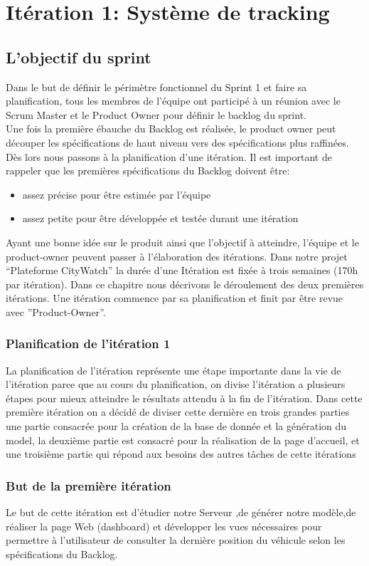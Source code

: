 \section{Itération 1: Système de tracking}

\subsection{L'objectif du sprint}
Dans le but de définir le périmètre fonctionnel du Sprint 1 et faire
sa planification, tous les membres de l'équipe ont participé à un réunion
avec le Scrum Master et le Product Owner pour définir le backlog du sprint.\\

Une fois la première ébauche du Backlog est réalisée, le product owner peut découper
les spécifications de haut niveau vers des spécifications plus raffinées. Dès lors nous
passons à la planification d’une itération. Il est important de rappeler que les premières
spécifications du Backlog doivent être:
\begin{itemize}
 \item assez précise pour être estimée par l’équipe
 \item assez petite pour être développée et testée durant une itération
\end{itemize}
Ayant une bonne idée sur le produit ainsi que l’objectif à atteindre, l’équipe et le
product-owner peuvent passer à l’élaboration des itérations.
Dans notre projet
``Plateforme CityWatch''
la durée d’une Itération est fixée à trois
semaines (170h par itération). Dans ce chapitre nous décrivons le déroulement des deux
premières itérations. Une itération commence par sa planification et finit par être revue
avec ”Product-Owner”.
\subsubsection{Planification de l'itération 1}
La planification de l’itération représente une étape importante dans la vie de
l’itération parce que au cours du planification, on divise l’itération a plusieurs étapes
pour mieux atteindre le résultats attendu à la fin de l’itération.
Dans cette première itération on a décidé de diviser cette dernière en trois grandes
parties une partie consacrée pour la création de la base de donnée et la génération du
model, la deuxième partie est consacré pour la réalisation de la page d’accueil, et une
troisième partie qui répond aux besoins des autres tâches de cette itérations
\subsubsection{But de la première itération}
Le but de cette itération est d'étudier notre Serveur ,de générer notre modèle,de réaliser
la page Web (dashboard) et développer les vues nécessaires pour permettre à l'utilisateur 
de consulter la dernière position du véhicule selon les spécifications du Backlog. 
